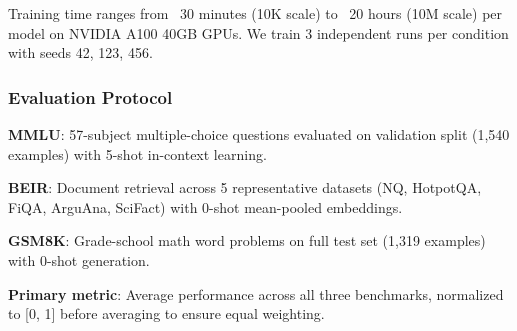 Training time ranges from ~30 minutes (10K scale) to ~20 hours (10M scale) per model on NVIDIA A100 40GB GPUs. We train 3 independent runs per condition with seeds {42, 123, 456}.

\subsubsection{Evaluation Protocol}

\textbf{MMLU}: 57-subject multiple-choice questions evaluated on validation split (1,540 examples) with 5-shot in-context learning.

\textbf{BEIR}: Document retrieval across 5 representative datasets (NQ, HotpotQA, FiQA, ArguAna, SciFact) with 0-shot mean-pooled embeddings.

\textbf{GSM8K}: Grade-school math word problems on full test set (1,319 examples) with 0-shot generation.

\textbf{Primary metric}: Average performance across all three benchmarks, normalized to [0, 1] before averaging to ensure equal weighting.
